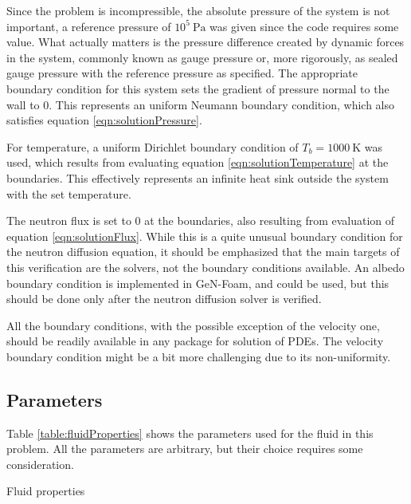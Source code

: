 Since the problem is incompressible, the absolute pressure of the system is not important, a reference pressure of $ 10^{5} \ \text{Pa} $ was given since the code requires some value.
What actually matters is the pressure difference created by dynamic forces in the system, commonly known as gauge pressure or, more rigorously, as sealed gauge pressure with the reference pressure as specified.
The appropriate boundary condition for this system sets the gradient of pressure normal to the wall to 0.
This represents an uniform Neumann boundary condition, which also satisfies equation \ref{eqn:solutionPressure}.

For temperature, a uniform Dirichlet boundary condition of $ T_{b} = 1000 \ \text{K} $ was used, which results from evaluating equation \ref{eqn:solutionTemperature} at the boundaries.
This effectively represents an infinite heat sink outside the system with the set temperature.

The neutron flux is set to 0 at the boundaries, also resulting from evaluation of equation \ref{eqn:solutionFlux}.
While this is a quite unusual boundary condition for the neutron diffusion equation, it should be emphasized that the main targets of this verification are the solvers, not the boundary conditions available.
An albedo boundary condition is implemented in GeN-Foam, and could be used, but this should be done only after the neutron diffusion solver is verified.

All the boundary conditions, with the possible exception of the velocity one,  should be readily available in any package for solution of PDEs.
The velocity boundary condition might be a bit more challenging due to its non-uniformity.

\subsection{Parameters}

Table \ref{table:fluidProperties} shows the parameters used for the fluid in this problem.
All the parameters are arbitrary, but their choice requires some consideration.

\begin{table}[htbp]
	\caption{Fluid properties}
	\centering
	
	\label{table:fluidProperties}
\end{table}


